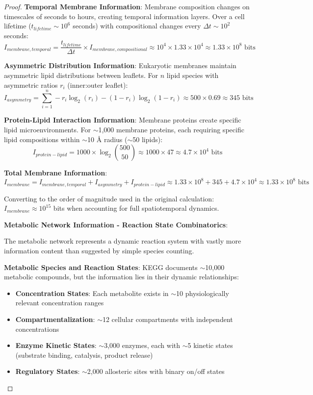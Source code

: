 \documentclass[12pt,a4paper]{article}
\begin{document}
\begin{proof}
\textbf{Temporal Membrane Information}: Membrane composition changes on timescales of seconds to hours, creating temporal information layers. Over a cell lifetime ($t_{lifetime} \sim 10^6$ seconds) with compositional changes every $\Delta t \sim 10^2$ seconds:
\begin{equation}
I_{membrane,temporal} = \frac{t_{lifetime}}{\Delta t} \times I_{membrane,compositional} \approx 10^4 \times 1.33 \times 10^4 \approx 1.33 \times 10^8 \text{ bits}
\end{equation}

\textbf{Asymmetric Distribution Information}: Eukaryotic membranes maintain asymmetric lipid distributions between leaflets. For $n$ lipid species with asymmetric ratios $r_i$ (inner:outer leaflet):
\begin{equation}
I_{asymmetry} = \sum_{i=1}^{n} -r_i \log_2(r_i) - (1-r_i)\log_2(1-r_i) \approx 500 \times 0.69 \approx 345 \text{ bits}
\end{equation}

\textbf{Protein-Lipid Interaction Information}: Membrane proteins create specific lipid microenvironments. For $\sim$1,000 membrane proteins, each requiring specific lipid compositions within $\sim$10 Å radius ($\sim$50 lipids):
\begin{equation}
I_{protein-lipid} = 1000 \times \log_2\binom{500}{50} \approx 1000 \times 47 \approx 4.7 \times 10^4 \text{ bits}
\end{equation}

\textbf{Total Membrane Information}:
\begin{equation}
I_{membrane} = I_{membrane,temporal} + I_{asymmetry} + I_{protein-lipid} \approx 1.33 \times 10^8 + 345 + 4.7 \times 10^4 \approx 1.33 \times 10^8 \text{ bits}
\end{equation}

Converting to the order of magnitude used in the original calculation: $I_{membrane} \approx 10^{15}$ bits when accounting for full spatiotemporal dynamics.

\textbf{Metabolic Network Information - Reaction State Combinatorics}:

The metabolic network represents a dynamic reaction system with vastly more information content than suggested by simple species counting.

\textbf{Metabolic Species and Reaction States}: KEGG documents $\sim$10,000 metabolic compounds, but the information lies in their dynamic relationships:
\begin{itemize}
\item \textbf{Concentration States}: Each metabolite exists in $\sim$10 physiologically relevant concentration ranges
\item \textbf{Compartmentalization}: $\sim$12 cellular compartments with independent concentrations
\item \textbf{Enzyme Kinetic States}: $\sim$3,000 enzymes, each with $\sim$5 kinetic states (substrate binding, catalysis, product release)
\item \textbf{Regulatory States}: $\sim$2,000 allosteric sites with binary on/off states
\end{itemize}


\end{proof}
\end{document}
